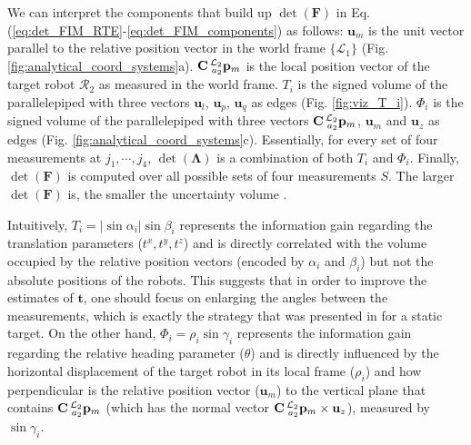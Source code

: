 \documentclass[journal]{IEEEtran}
\newcommand{\abs}[1]{\left\lvert#1\right\rvert}
\def\Robot{\mathcal{R}}
\def\AlignedPosTarg{\mathbf{C} \prescript{\mathcal{L}_2}{a_2}{\mathbf{p}}} %
\def\FIM{\mathbf{F}}
\def\detF{\det(\FIM)}
\def\detL{\det(\mathbf{\Lambda})}
\def\UnitZ{\mathbf{u}_z}
\begin{document}
We can interpret the components that build up $\detF$ in Eq. (\ref{eq:det_FIM_RTE}-\ref{eq:det_FIM_components}) as follows: $\mathbf{u}_m$ is the unit vector parallel to the relative position vector in the world frame $\{\mathcal{L}_1\}$ (Fig. \ref{fig:analytical_coord_systems}a). 
$\AlignedPosTarg_m$ is the local position vector of the target robot $\Robot_2$ as measured in the world frame. 
$T_i$ is the signed volume of the parallelepiped with three vectors $\mathbf{u}_l$, $\mathbf{u}_p$, $\mathbf{u}_q$ as edges (Fig. \ref{fig:viz_T_i}). 
$\Phi_i$ is the signed volume of the parallelepiped with three vectors $\AlignedPosTarg_m$, $\mathbf{u}_m$ and $\UnitZ$ as edges (Fig. \ref{fig:analytical_coord_systems}c). Essentially, for every set of four measurements at $j_1,\cdots,j_4$, $\detL$ is a combination of both $T_i$ and $\Phi_i$. Finally, $\detF$ is computed over all possible sets of four measurements $S$. The larger $\detF$ is, the smaller the uncertainty volume \cite{ly2017FIMtutorial}.

Intuitively, $T_i = \abs{\sin\alpha_i} \sin\beta_i$ represents the information gain regarding the translation parameters ($t^x, t^y, t^z$) and is directly correlated with the volume occupied by the relative position vectors (encoded by $\alpha_i$ and $\beta_i$) but not the absolute positions of the robots. This suggests that in order to improve the estimates of $\mathbf{t}$, one should focus on enlarging the angles between the measurements, which is exactly the strategy that was presented in \cite{guo2017reloc} for a static target. 
On the other hand, $\Phi_i = \rho_i \sin\gamma_i$ represents the information gain regarding the relative heading parameter ($\theta$) and is directly influenced by the horizontal displacement of the target robot in its local frame ($\rho_i$) and how perpendicular is the relative position vector ($\mathbf{u}_m$) to the vertical plane that contains $\AlignedPosTarg_m$ (which has the normal vector $\AlignedPosTarg_m \times \UnitZ$), measured by $\sin\gamma_i$. 
\end{document}
